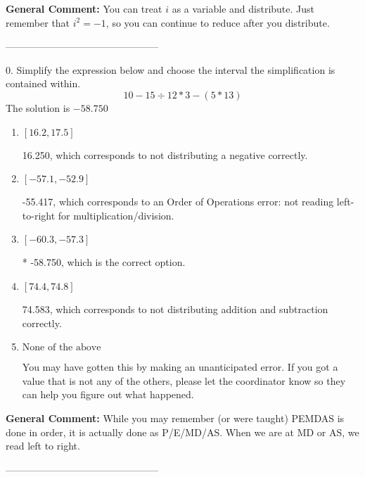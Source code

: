 \documentclass{extbook}[14pt]
\begin{document}
\textbf{General Comment:} You can treat $i$ as a variable and distribute. Just remember that $i^2=-1$, so you can continue to reduce after you distribute. 

-----------------------------------------------

0. Simplify the expression below and choose the interval the simplification is contained within.
\[ 10 - 15 \div 12 * 3 - (5 * 13) \] 
The solution is $ -58.750 $ 

\begin{enumerate}[label=\Alph*.] 
\item $ [16.2, 17.5] $ 

  16.250, which corresponds to not distributing a negative correctly. 
\item $ [-57.1, -52.9] $ 

  -55.417, which corresponds to an Order of Operations error: not reading left-to-right for multiplication/division. 
\item $ [-60.3, -57.3] $ 

 * -58.750, which is the correct option. 
\item $ [74.4, 74.8] $ 

  74.583, which corresponds to not distributing addition and subtraction correctly. 
\item $ \text{None of the above} $ 

  You may have gotten this by making an unanticipated error. If you got a value that is not any of the others, please let the coordinator know so they can help you figure out what happened. 
\end{enumerate} 
 
\textbf{General Comment:} While you may remember (or were taught) PEMDAS is done in order, it is actually done as P/E/MD/AS. When we are at MD or AS, we read left to right. 

-----------------------------------------------
\end{document}
